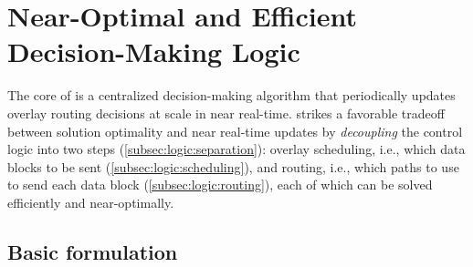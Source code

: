 \section{Near-Optimal and Efficient Decision-Making Logic}
\label{sec:logic}

The core of \name is a centralized decision-making algorithm that
periodically updates overlay routing decisions at scale in near
real-time. \name strikes a favorable tradeoff
between solution optimality and near real-time updates by
{\em decoupling} the control logic into two steps
(\Section\ref{subsec:logic:separation}):
overlay scheduling, i.e., which data blocks to be sent
(\Section\ref{subsec:logic:scheduling}),
and routing, i.e., which paths to use to send each data block
(\Section\ref{subsec:logic:routing}), each of which
can be solved efficiently and near-optimally.%

\subsection{Basic formulation}
\label{subsec:logic:formulation}



